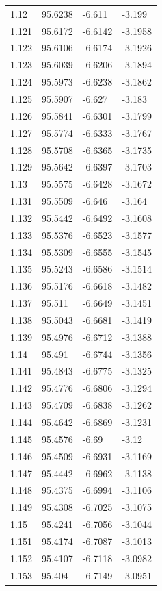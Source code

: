 \begin{tabular}{llll}
1.12 & 95.6238 & -6.611 & -3.199 \\
1.121 & 95.6172 & -6.6142 & -3.1958 \\
1.122 & 95.6106 & -6.6174 & -3.1926 \\
1.123 & 95.6039 & -6.6206 & -3.1894 \\
1.124 & 95.5973 & -6.6238 & -3.1862 \\
1.125 & 95.5907 & -6.627 & -3.183 \\
1.126 & 95.5841 & -6.6301 & -3.1799 \\
1.127 & 95.5774 & -6.6333 & -3.1767 \\
1.128 & 95.5708 & -6.6365 & -3.1735 \\
1.129 & 95.5642 & -6.6397 & -3.1703 \\
1.13 & 95.5575 & -6.6428 & -3.1672 \\
1.131 & 95.5509 & -6.646 & -3.164 \\
1.132 & 95.5442 & -6.6492 & -3.1608 \\
1.133 & 95.5376 & -6.6523 & -3.1577 \\
1.134 & 95.5309 & -6.6555 & -3.1545 \\
1.135 & 95.5243 & -6.6586 & -3.1514 \\
1.136 & 95.5176 & -6.6618 & -3.1482 \\
1.137 & 95.511 & -6.6649 & -3.1451 \\
1.138 & 95.5043 & -6.6681 & -3.1419 \\
1.139 & 95.4976 & -6.6712 & -3.1388 \\
1.14 & 95.491 & -6.6744 & -3.1356 \\
1.141 & 95.4843 & -6.6775 & -3.1325 \\
1.142 & 95.4776 & -6.6806 & -3.1294 \\
1.143 & 95.4709 & -6.6838 & -3.1262 \\
1.144 & 95.4642 & -6.6869 & -3.1231 \\
1.145 & 95.4576 & -6.69 & -3.12 \\
1.146 & 95.4509 & -6.6931 & -3.1169 \\
1.147 & 95.4442 & -6.6962 & -3.1138 \\
1.148 & 95.4375 & -6.6994 & -3.1106 \\
1.149 & 95.4308 & -6.7025 & -3.1075 \\
1.15 & 95.4241 & -6.7056 & -3.1044 \\
1.151 & 95.4174 & -6.7087 & -3.1013 \\
1.152 & 95.4107 & -6.7118 & -3.0982 \\
1.153 & 95.404 & -6.7149 & -3.0951 \\

\end{tabular}
